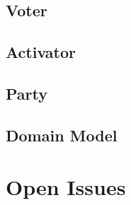 \documentclass[11pt]{article}
\begin{document}
	\subsection{Voter}
		
		\newpage
		
	\subsection{Activator}
		
		\newpage
		
	\subsection{Party}
		
		\newpage
		
	\subsection{Domain Model}
		
		\newpage
		
	\section{Open Issues}
		
	
\end{document}
